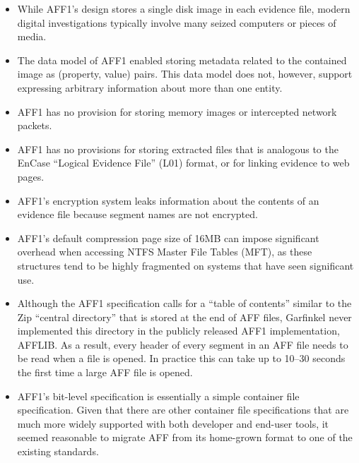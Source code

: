 \documentclass[10pt, conference]{IEEEtran}
\begin{document}
\begin{itemize}
\item While AFF1's design stores a single disk image in each evidence
  file, modern digital investigations typically involve many seized
  computers or pieces of media. 

\item The data model of AFF1 enabled storing metadata related to the 
  contained image as (property, value) pairs. This data model does
  not, however, support expressing arbitrary information about more
  than one entity.

\item AFF1 has no provision for storing memory images or intercepted
  network packets.

\item AFF1 has no provisions for storing extracted files that is
  analogous to the EnCase ``Logical Evidence File'' (L01) format, or
  for linking evidence to web pages.

\item AFF1's encryption system leaks information about the contents of
  an evidence file because segment names are not encrypted.

\item AFF1's default compression page size of 16MB can impose significant overhead
  when accessing NTFS Master File Tables (MFT), as these structures
  tend to be highly fragmented on systems that have seen significant
  use.

\item Although the AFF1 specification calls for a ``table of contents'' similar
  to the Zip\cite{zip-format} ``central directory'' that is stored at
  the end of AFF files, Garfinkel never implemented this directory in
  the publicly released AFF1 implementation, AFFLIB. As a result,
  every header of every segment in an AFF file needs to be read when a
  file is opened. In practice this can take up to 10--30 seconds the
  first time a large AFF file is opened. 

\item AFF1's bit-level specification is essentially a simple container
  file specification. Given that there are other container file
  specifications that are much more widely supported with both
  developer and end-user tools, it seemed reasonable to migrate AFF
  from its home-grown format to one of the existing standards.

\end{itemize}
\end{document}
